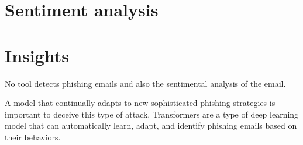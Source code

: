 \section{Sentiment analysis}

\section{Insights}

No tool detects phishing emails and also the sentimental analysis of the email.

A model that continually adapts to new sophisticated phishing strategies is important to deceive this type of attack. Transformers are a type of deep learning model that can automatically learn, adapt, and identify phishing emails based on their behaviors.